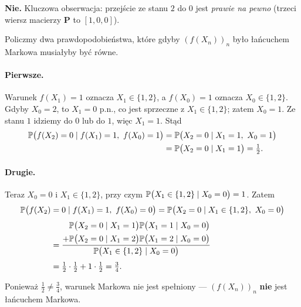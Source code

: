 \documentclass[dvipsnames]{book}
\begin{document}
\textbf{Nie.} Kluczowa obserwacja: przejście ze stanu $2$ do $0$ jest
\emph{prawie na pewno} (trzeci wiersz macierzy $\mathbf{P}$ to $[1,0,0]$).

Policzmy dwa prawdopodobieństwa, które gdyby $(f(X_n))_n$ było łańcuchem
Markowa musiałyby być równe.

\paragraph{Pierwsze.} Warunek $f(X_1) = 1$ oznacza $X_1 \in \{1,2\}$, a
$f(X_0) = 1$ oznacza $X_0 \in \{1,2\}$. Gdyby $X_0 = 2$, to $X_1 = 0$ p.n., co
jest sprzeczne z $X_1 \in \{1,2\}$; zatem $X_0 = 1$. Ze stanu $1$ idziemy do
$0$ lub do $1$, więc $X_1 = 1$. Stąd
\begin{align*}
  \P\big(f(X_2) = 0 \mid f(X_1) = 1,\ f(X_0) = 1\big)
  &= \P\big(X_2 = 0 \mid X_1 = 1,\ X_0 = 1\big) \\
  &= \P\big(X_2 = 0 \mid X_1 = 1\big) = \tfrac{1}{2}.
\end{align*}

\paragraph{Drugie.} Teraz $X_0 = 0$ i $X_1 \in \{1,2\}$, przy czym
$\P\big(X_1 \in \{1,2\} \mid X_0 = 0\big) = 1$. Zatem
\begin{align*}
  \P\big(f(X_2) &= 0 \mid f(X_1) = 1,\ f(X_0) = 0\big)
  = \P\big(X_2 = 0 \mid X_1 \in \{1,2\},\ X_0 = 0\big) \\[1mm]
  &= \frac{\begin{aligned}
             &\P\big(X_2 = 0 \mid X_1 = 1\big)\P\big(X_1 = 1 \mid X_0 = 0\big) \\
             + &\P\big(X_2 = 0 \mid X_1 = 2\big)\P\big(X_1 = 2 \mid X_0 = 0\big)
           \end{aligned}}
          {\P\big(X_1 \in \{1,2\} \mid X_0 = 0\big)} \\[1mm]
  &= \tfrac{1}{2} \cdot \tfrac{1}{2} + 1 \cdot \tfrac{1}{2} = \tfrac{3}{4}.
\end{align*}

Ponieważ $\tfrac{1}{2} \neq \tfrac{3}{4}$, warunek Markowa nie jest spełniony
--- $(f(X_n))_n$ \textbf{nie} jest łańcuchem Markowa.
\end{document}
